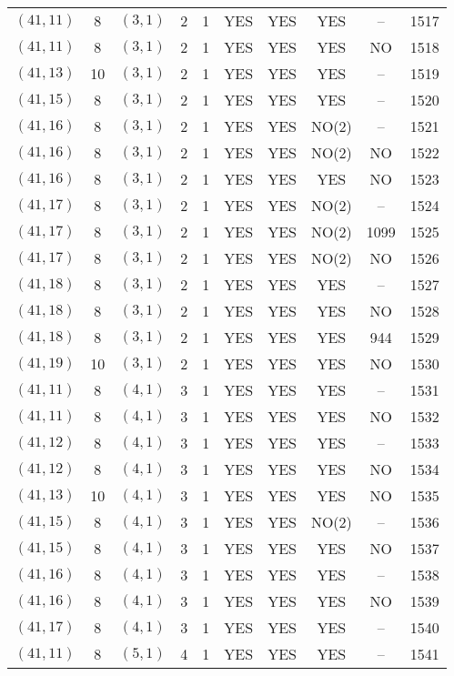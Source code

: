 \begin{longtable}{|c|c|c|c|c|c|c|c|c|c|}
$(41, 11)$ & 8 & $(3, 1)$ & 2 & 1 & YES & YES & YES & -- & 1517\\
$(41, 11)$ & 8 & $(3, 1)$ & 2 & 1 & YES & YES & YES & NO & 1518\\
$(41, 13)$ & 10 & $(3, 1)$ & 2 & 1 & YES & YES & YES & -- & 1519\\
$(41, 15)$ & 8 & $(3, 1)$ & 2 & 1 & YES & YES & YES & -- & 1520\\
$(41, 16)$ & 8 & $(3, 1)$ & 2 & 1 & YES & YES & NO(2) & -- & 1521\\
$(41, 16)$ & 8 & $(3, 1)$ & 2 & 1 & YES & YES & NO(2) & NO & 1522\\
$(41, 16)$ & 8 & $(3, 1)$ & 2 & 1 & YES & YES & YES & NO & 1523\\
$(41, 17)$ & 8 & $(3, 1)$ & 2 & 1 & YES & YES & NO(2) & -- & 1524\\
$(41, 17)$ & 8 & $(3, 1)$ & 2 & 1 & YES & YES & NO(2) & 1099 & 1525\\
$(41, 17)$ & 8 & $(3, 1)$ & 2 & 1 & YES & YES & NO(2) & NO & 1526\\
$(41, 18)$ & 8 & $(3, 1)$ & 2 & 1 & YES & YES & YES & -- & 1527\\
$(41, 18)$ & 8 & $(3, 1)$ & 2 & 1 & YES & YES & YES & NO & 1528\\
$(41, 18)$ & 8 & $(3, 1)$ & 2 & 1 & YES & YES & YES & 944 & 1529\\
$(41, 19)$ & 10 & $(3, 1)$ & 2 & 1 & YES & YES & YES & NO & 1530\\
$(41, 11)$ & 8 & $(4, 1)$ & 3 & 1 & YES & YES & YES & -- & 1531\\
$(41, 11)$ & 8 & $(4, 1)$ & 3 & 1 & YES & YES & YES & NO & 1532\\
$(41, 12)$ & 8 & $(4, 1)$ & 3 & 1 & YES & YES & YES & -- & 1533\\
$(41, 12)$ & 8 & $(4, 1)$ & 3 & 1 & YES & YES & YES & NO & 1534\\
$(41, 13)$ & 10 & $(4, 1)$ & 3 & 1 & YES & YES & YES & NO & 1535\\
$(41, 15)$ & 8 & $(4, 1)$ & 3 & 1 & YES & YES & NO(2) & -- & 1536\\
$(41, 15)$ & 8 & $(4, 1)$ & 3 & 1 & YES & YES & YES & NO & 1537\\
$(41, 16)$ & 8 & $(4, 1)$ & 3 & 1 & YES & YES & YES & -- & 1538\\
$(41, 16)$ & 8 & $(4, 1)$ & 3 & 1 & YES & YES & YES & NO & 1539\\
$(41, 17)$ & 8 & $(4, 1)$ & 3 & 1 & YES & YES & YES & -- & 1540\\
$(41, 11)$ & 8 & $(5, 1)$ & 4 & 1 & YES & YES & YES & -- & 1541\\

\end{longtable}
